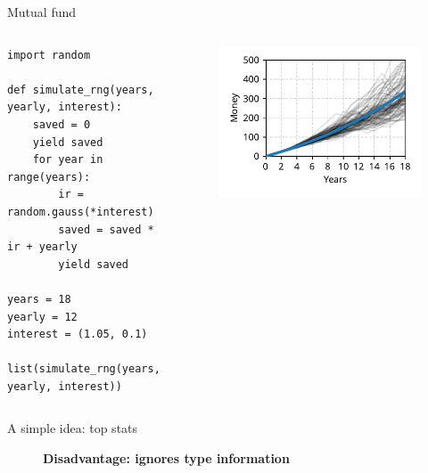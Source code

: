 \documentclass[12pt, aspectratio=149]{beamer}
\theoremstyle{plain}
\begin{document}
\begin{frame}[fragile]{Mutual fund}
\begin{columns}
\begin{column}{0.55\textwidth}
    \begin{center}
     \begin{verbatim} 
import random

def simulate_rng(years, yearly, interest):
    saved = 0
    yield saved
    for year in range(years):
        ir = random.gauss(*interest)
        saved = saved * ir + yearly
        yield saved
        
years = 18
yearly = 12
interest = (1.05, 0.1)

list(simulate_rng(years, yearly, interest))
     \end{verbatim}
     \end{center}
\end{column}
\begin{column}{0.45\textwidth}  %
    \begin{center}
     \begin{figure}
     	\centering
     	\includegraphics[width=0.99\linewidth]{figures/mutual_fund_simulations}
     \end{figure}
     \end{center}
\end{column}
\end{columns}
\end{frame}

\begin{frame}[fragile]{A simple idea: top stats}
\begin{figure}
	\centering
	\begin{center}
		\textbf{Disadvantage: ignores type information}
	\end{center}
\end{figure}
\end{frame}
\end{document}

